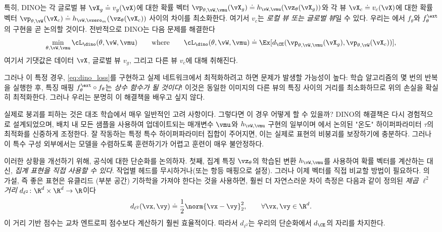 \documentclass[../../book-main_ko.tex]{subfiles}
\begin{document}
특히, DINO는 각 글로벌 뷰 \(\vX_{g} \doteq v_{g}(\vX)\)에 대한 확률 벡터 \(\vp_{\theta, \vW, \vmu}(\vX_{g}) \doteq h_{\vW, \vmu}(\vz_{\theta}(\vX_{g}))\)와 각 뷰 \(\vX_{c} \doteq v_{c}(\vX)\)에 대한 확률 벡터 \(\vp_{\theta, \vW}(\vX_{c}) \doteq h_{\vW, \vzero_{m}}(\vz_{\theta}(\vX_{c}))\) 사이의 차이를 최소화한다. 여기서 \(v_{c}\)는 \textit{로컬 뷰 또는 글로벌 뷰}일 수 있다. 우리는 에서 \(f_{\theta}\)와 \(f_{\theta}^{\ext}\)의 구현을 곧 논의할 것이다. 전반적으로 DINO는 다음 문제를 해결한다
 \begin{equation}\label{eq:dino_loss}
     \min_{\theta, \vW, \vmu}\cL_{\dino}(\theta, \vW, \vmu) \qquad \text{where} \qquad \cL_{\dino}(\theta, \vW, \vmu) \doteq \Ex[d_{\CE}(\vp_{\theta, \vW, \vmu}(\vX_{g}), \vp_{\theta, \vW}(\vX_{c}))],
\end{equation}
여기서 기댓값은 데이터 \(\vX\), 글로벌 뷰 \(v_{g}\), 그리고 다른 뷰 \(v_{c}\)에 대해 취해진다.

그러나 이 특정 경우, \eqref{eq:dino_loss}를 구현하고 실제 네트워크에서 최적화하려고 하면 문제가 발생할 가능성이 높다: 학습 알고리즘의 몇 번의 반복을 실행한 후, 특징 매핑 \(f_{\theta}^{\ext} \circ f_{\theta}\)는 \textit{상수 함수가 될 것이다}! 이것은 동일한 이미지의 다른 뷰의 특징 사이의 거리를 최소화하므로 위의 손실을 확실히 최적화한다. 그러나 우리는 분명히 이 해결책을 배우고 싶지 않다.

실제로 붕괴를 피하는 것은 대조 학습에서 매우 일반적인 고려 사항이다. 그렇다면 이 경우 어떻게 할 수 있을까? DINO의 해결책은 다시 경험적으로 설계되었으며, 배치 내 모든 샘플을 사용하여 업데이트되는 매개변수 \(\vmu\)와 \(h_{\vW, \vmu}\) 구현의 일부이며 에서 논의된 "온도" 하이퍼파라미터 \(\tau\)의 최적화를 신중하게 조정한다. 잘 작동하는 특정 특수 하이퍼파라미터 집합이 주어지면, 이는 실제로 표현의 비붕괴를 보장하기에 충분하다. 그러나 이 특수 구성 외부에서는 모델을 수렴하도록 훈련하기가 어렵고 훈련이 매우 불안정하다.

이러한 상황을 개선하기 위해, 공식에 대한 단순화를 논의하자. 첫째, 집계 특징 \(\vz_{\theta}\)의 학습된 변환 \(h_{\vW, \vmu}\)를 사용하여 확률 벡터를 계산하는 대신, \textit{집계 표현을 직접 사용할 수 있다}. 작업별 헤드를 무시하거나(또는 항등 매핑으로 설정). 그러나 이제 벡터를 직접 비교할 방법이 필요하다. 의 가설, 즉 좋은 표현은 유클리드 (부분 공간) 기하학을 가져야 한다는 것을 사용하면, 훨씬 더 자연스러운 차이 측정은 다음과 같이 정의된 \textit{제곱 \(\ell^{2}\) 거리} \(d_{\ell^{2}} \colon \R^{d} \times \R^{d} \to \R\)이다
\begin{equation}\label{eq:cosine_similarity}
    d_{\ell^{2}}(\vx, \vy) \doteq \frac{1}{2}\norm{\vx - \vy}_{2}^{2}, \qquad  \forall \vx, \vy \in \R^{d}.
\end{equation}
이 거리 기반 점수는 교차 엔트로피 점수보다 계산하기 훨씬 효율적이다. 따라서 \(d_{\ell^{2}}\)는 우리의 단순화에서 \(d_{\CE}\)의 자리를 차지한다.
\end{document}
